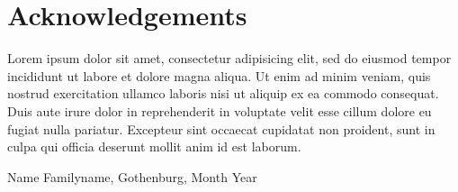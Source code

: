 \thispagestyle{plain}			%
\section*{Acknowledgements}


Lorem ipsum dolor sit amet, consectetur adipisicing elit, sed do eiusmod tempor incididunt ut labore et dolore magna aliqua. Ut enim ad minim veniam, quis nostrud exercitation ullamco laboris nisi ut aliquip ex ea commodo consequat. Duis aute irure dolor in reprehenderit in voluptate velit esse cillum dolore eu fugiat nulla pariatur. Excepteur sint occaecat cupidatat non proident, sunt in culpa qui officia deserunt mollit anim id est laborum.

\vspace{1.5cm}
\hfill
Name Familyname, Gothenburg, Month Year

\newpage				%
\thispagestyle{empty}
\mbox{}